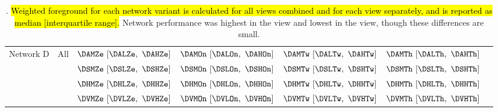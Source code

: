 \begin{sidewaystable*}
\begin{center}
\begin{tabular}{ccccccc}
\midrule
Network D & All    & $\DAMZe~[\DALZe,~\DAHZe]$ & $\DAMOn~[\DALOn,~\DAHOn]$ & $\DAMTw~[\DALTw,~\DAHTw]$ & $\DAMTh~[\DALTh,~\DAHTh]$ \\
          & \SA{}  & $\DSMZe~[\DSLZe,~\DSHZe]$ & $\DSMOn~[\DSLOn,~\DSHOn]$ & $\DSMTw~[\DSLTw,~\DSHTw]$ & $\DSMTh~[\DSLTh,~\DSHTh]$ \\
          & \HLA{} & $\DHMZe~[\DHLZe,~\DHHZe]$ & $\DHMOn~[\DHLOn,~\DHHOn]$ & $\DHMTw~[\DHLTw,~\DHHTw]$ & $\DHMTh~[\DHLTh,~\DHHTh]$ \\
          & \VLA{} & $\DVMZe~[\DVLZe,~\DVHZe]$ & $\DVMOn~[\DVLOn,~\DVHOn]$ & $\DVMTw~[\DVLTw,~\DVHTw]$ & $\DVMTh~[\DVLTh,~\DVHTh]$ \\
\bottomrule
\end{tabular}
\caption[\captiontitle{}]{\captiontitle{}.
\hl{
Weighted foreground \IoU{} for each network variant is calculated for all views combined and for each view separately, and is reported as median [interquartile range].
}
Network performance was highest in the \SA{} view and lowest in the \HLA{} view, though these differences are small.
}
\label{tab:architectureaccuracy}
\end{center}
\end{sidewaystable*}
